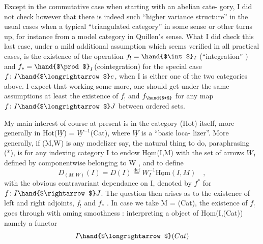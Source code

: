 Except in the commutative case when starting with an abelian cate-%
gory, I did not check however that  there is indeed such ``higher
variance structure'' in the usual cases\hand{,} when a typical ``triangulated
category'' in some sense or other turns up,  for instance from a model
category in Quillen's sense.  What I did check  this last case,  under
a mild additional assumption which seems verified in all practical cases,
is the existence of the operation  $f_! = \hand{$\int$}_I$  (``integration'' ) and
$f_* = \hand{$\prod$}_I$(cointegration) for the special case $f\colon I \hand{$\longrightarrow$} e$,  when I is either
one of the two categories\inserted{(**)} above.  I expect that working some more,  one
should get under the same assumptions  at least the existence of
$f_!$ and $f_{\hand{$*$}}$  for any map $f\colon I \hand{$\longrightarrow$} J$ between ordered sets.

My main interest of course at present is in the category (Hot)
itself,  more generally in Hot($\underline{W}$) = $\underline{W}^{-1}$(Cat),  where $\underline{W}$ is a ``basic loca-%
lizer''.  More generally,  if (M,W)  is any modelizer say,  the natural
thing to do,  paraphrasing (*),  is for any indexing category I to
endow  $\underline{\mathrm{Hom}}$(I,M)  with the set of arrows $W_I$  defined by componentwise
belonging to W ,  and to define
\[ D_{(M,W)}(I) = D(I) \overset{\mathrm{def}}{=} W_I^{-1}\underline{\mathrm{Hom}}(I,M) \quad , \]
with the obvious contravariant dependance on I,  denoted by $f^*$  for
$f\colon I \hand{$\rightarrow$} J$.  The question  then arises as to the existence of left and
right adjoints,  $f_!$  and $f_*$ .  In case we take M = (Cat),  the existence
of  $f_!$  goes through with aming smoothness :  interpreting a object
of  $\underline{\mathrm{Hom}}$(I,(Cat))   namely a functor
\[ I \hand{$\longrightarrow$} (Cat) \]

